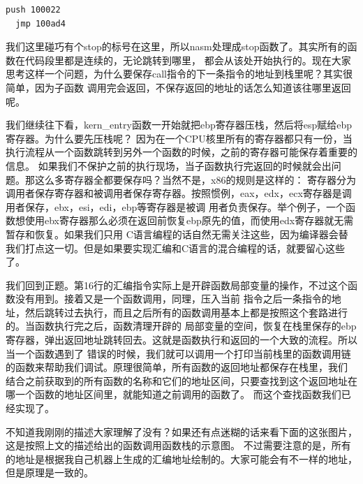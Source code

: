 \begin{Verbatim}[frame=single]
  push 100022
  jmp 100ad4
\end{Verbatim}

\par 我们这里碰巧有个stop的标号在这里，所以nasm处理成stop函数了。其实所有的函数在代码段里都是连续的，无论跳转到哪里，\allowbreak
都会从该处开始执行的。现在大家思考这样一个问题，为什么要保存call指令的下一条指令的地址到栈里呢？其实很简单，因为子函数\allowbreak
调用完会返回，不保存返回的地址的话怎么知道该往哪里返回呢。

\par 我们继续往下看，kern\_entry函数一开始就把ebp寄存器压栈，然后将esp赋给ebp寄存器。为什么要先压栈呢？\allowbreak
因为在一个CPU核里所有的寄存器都只有一份，当执行流程从一个函数跳转到另外一个函数的时候，之前的寄存器可能保存着重要的信息。\allowbreak
如果我们不保护之前的执行现场，当子函数执行完返回的时候就会出问题。那这么多寄存器全都要保存吗？当然不是，x86的规则是这样的：\allowbreak
寄存器分为调用者保存寄存器和被调用者保存寄存器。按照惯例，eax，edx，ecx寄存器是调用者保存，ebx，esi，edi，ebp等寄存器是被调\allowbreak
用者负责保存。举个例子，一个函数想使用ebx寄存器那么必须在返回前恢复ebp原先的值，而使用edx寄存器就无需暂存和恢复。如果我们只用\allowbreak
C语言编程的话自然无需关注这些，因为编译器会替我们打点这一切。但是如果要实现汇编和C语言的混合编程的话，就要留心这些了。

\par 我们回到正题。第16行的汇编指令实际上是开辟函数局部变量的操作，不过这个函数没有用到。接着又是一个函数调用，同理，压入当前\allowbreak
指令之后一条指令的地址，然后跳转过去执行，而且之后所有的函数调用基本上都是按照这个套路进行的。当函数执行完之后，函数清理开辟的\allowbreak
局部变量的空间，恢复在栈里保存的ebp寄存器，弹出返回地址跳转回去。这就是函数执行和返回的一个大致的流程。所以当一个函数遇到了\allowbreak
错误的时候，我们就可以调用一个打印当前栈里的函数调用链的函数来帮助我们调试。原理很简单，所有函数的返回地址都保存在栈里，我们\allowbreak
结合之前获取到的所有函数的名称和它们的地址区间，只要查找到这个返回地址在哪一个函数的地址区间里，就能知道之前调用的函数了。\allowbreak
而这个查找函数我们已经实现了。

\par 不知道我刚刚的描述大家理解了没有？如果还有点迷糊的话来看下面的这张图片，这是按照上文的描述给出的函数调用函数栈的示意图。\allowbreak
不过需要注意的是，所有的地址是根据我自己机器上生成的汇编地址绘制的。大家可能会有不一样的地址，但是原理是一致的。

